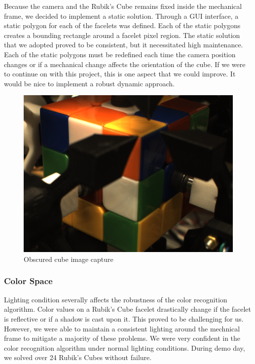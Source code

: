 \documentclass[final, letterpaper, 10 pt, conference, twocolumn]{IEEEtran}
\begin{document}
Because the camera and the Rubik's Cube remains fixed inside the mechanical frame, we decided to implement a static solution. Through a GUI interface, a static polygon for each of the facelets was defined. Each of the static polygons creates a bounding rectangle around a facelet pixel region. The static solution that we adopted proved to be consistent, but it necessitated high maintenance. Each of the static polygons must be redefined each time the camera position changes or if a mechanical change affects the orientation of the cube. If we were to continue on with this project, this is one aspect that we could improve. It would be nice to implement a robust dynamic approach.

\begin{figure}[!h]
\centering
\includegraphics[scale=0.15]{actual_cube_capture.png}
\caption{Obscured cube image capture}
\label{fig:Obscured Cube}
\end{figure}

\subsubsection{Color Space}
Lighting condition severally affects the robustness of the color recognition algorithm. Color values on a Rubik's Cube facelet drastically change if the facelet is reflective or if a shadow is cast upon it. This proved to be challenging for us. However, we were able to maintain a consistent lighting around the mechnical frame to mitigate a majority of these problems. We were very confident in the color recognition algorithm under normal lighting conditions. During demo day, we solved over 24 Rubik's Cubes without failure.
\end{document}
